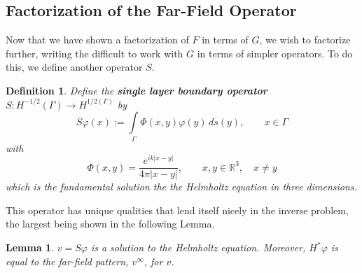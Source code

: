 \documentclass[]{article}
\newtheorem{definition}{Definition}
\newtheorem{lemma}{Lemma}
\newcommand{\bd}{\textbf}
\newcommand{\R}{\mathbb R}
\begin{document}
			\subsection{Factorization of the Far-Field Operator}
				Now that we have shown a factorization of $F$ in terms of $G$, we wish to factorize further, writing the difficult to work with $G$ in terms of simpler operators. To do this, we define another operator $S$.
				\begin{definition} \label{def:S}
					Define the \bd{single layer boundary operator} $S : H^{-1/2}(\Gamma) \to H^{1/2(\Gamma)}$ by
					\begin{equation}
						S\varphi(x) := \int\limits_\Gamma \Phi(x, y) \varphi(y)\, ds(y), \qquad x \in \Gamma
					\end{equation}
					with 
					\begin{equation}\label{eq:green's function}
						\Phi(x, y) = \frac{e^{ik|x-y|}}{4\pi|x-y|}, \qquad x, y \in \R^3, \quad x\neq y
					\end{equation}
					which is the fundamental solution the the Helmholtz equation in three dimensions.
				\end{definition}
				This operator has unique qualities that lend itself nicely in the inverse problem, the largest being shown in the following Lemma.
				\begin{lemma} \label{lemma:solution}
					$v= S\varphi$ is a solution to the Helmholtz equation. Moreover, $H^\ast \varphi$ is equal to the far-field pattern, $v^\infty$, for $v$.
				\end{lemma}
\end{document}
